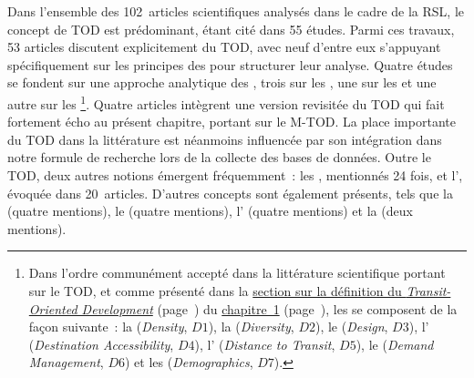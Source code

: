 \begin{refsegment}
Dans l'ensemble des 102~articles scientifiques analysés dans le cadre de la \acrshort{RSL}, le concept de \acrshort{TOD} est prédominant, étant cité dans 55 études. Parmi ces travaux, 53 articles discutent explicitement du \acrshort{TOD}, avec neuf d'entre eux s'appuyant spécifiquement sur les principes des  pour structurer leur analyse. Quatre études se fondent sur une approche analytique des , trois sur les , une sur les  et une autre sur les \footnote{
    Dans l'ordre communément accepté dans la littérature scientifique portant sur le \acrshort{TOD}, et comme présenté dans la \hyperref[chap1:tod-presentation-generale-definition]{section sur la définition du \textsl{Transit-Oriented Development}} (page~\pageref{chap1:tod-presentation-generale-definition}) du \hyperref[chap1:titre]{chapitre~1} (page~\pageref{chap1:titre}), les  se composent de la façon suivante~: la  (\textsl{Density}, \(D1\)), la  (\textsl{Diversity}, \(D2\)), le  (\textsl{Design}, \(D3\)), l' (\textsl{Destination Accessibility}, \(D4\)), l' (\textsl{Distance to Transit}, \(D5\)), le  (\textsl{Demand Management}, \(D6\)) et les  (\textsl{Demographics}, \(D7\)).
}. Quatre articles intègrent une version revisitée du \acrshort{TOD} qui fait fortement écho au présent chapitre, portant sur le \acrshort{M-TOD}. La place importante du \acrshort{TOD} dans la littérature est néanmoins influencée par son intégration dans notre formule de recherche lors de la collecte des bases de données. Outre le \acrshort{TOD}, deux autres notions émergent fréquemment~: les , mentionnés 24 fois, et l', évoquée dans 20~articles. D'autres concepts sont également présents, tels que la  (quatre mentions), le  (quatre mentions), l' (quatre mentions) et la  (deux mentions).%


\end{refsegment}
